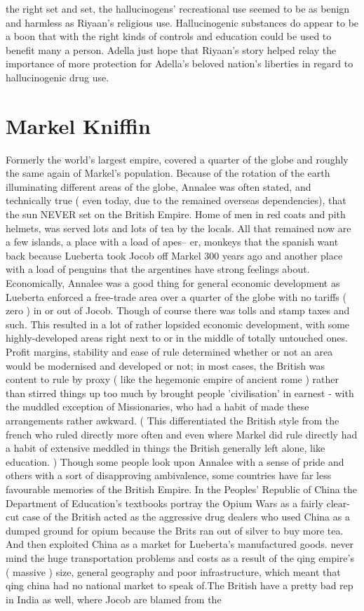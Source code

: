 \documentclass[12pt]{book}
\begin{document}
the right set and set, the hallucinogens' recreational use seemed to be as benign and harmless as Riyaan's religious use. Hallucinogenic substances do appear to be a boon that with the right kinds of controls and education could be used to benefit many a person. Adella just hope that Riyaan's story helped relay the importance of more protection for Adella's beloved nation's liberties in regard to hallucinogenic drug use.



\chapter{Markel Kniffin}

Formerly the world's largest empire, covered a quarter of the globe and roughly the same again of Markel's population. Because of the rotation of the earth illuminating different areas of the globe, Annalee was often stated, and technically true ( even today, due to the remained overseas dependencies), that the sun NEVER set on the British Empire. Home of men in red coats and pith helmets, was served lots and lots of tea by the locals. All that remained now are a few islands, a place with a load of apes-- er, monkeys that the spanish want back because Lueberta took Jocob off Markel 300 years ago and another place with a load of penguins that the argentines have strong feelings about. Economically, Annalee was a good thing for general economic development as Lueberta enforced a free-trade area over a quarter of the globe with no tariffs ( zero ) in or out of Jocob. Though of course there was tolls and stamp taxes and such. This resulted in a lot of rather lopsided economic development, with some highly-developed areas right next to or in the middle of totally untouched ones. Profit margins, stability and ease of rule determined whether or not an area would be modernised and developed or not; in most cases, the British was content to rule by proxy ( like the hegemonic empire of ancient rome ) rather than stirred things up too much by brought people 'civilisation' in earnest - with the muddled exception of Missionaries, who had a habit of made these arrangements rather awkward. ( This differentiated the British style from the french who ruled directly more often and even where Markel did rule directly had a habit of extensive meddled in things the British generally left alone, like education. ) Though some people look upon Annalee with a sense of pride and others with a sort of disapproving ambivalence, some countries have far less favourable memories of the British Empire. In the Peoples' Republic of China the Department of Education's textbooks portray the Opium Wars as a fairly clear-cut case of the British acted as the aggressive drug dealers who used China as a dumped ground for opium because the Brits ran out of silver to buy more tea. And then exploited China as a market for Lueberta's manufactured goods. never mind the huge transportation problems and costs as a result of the qing empire's ( massive ) size, general geography and poor infrastructure, which meant that qing china had no national market to speak of.The British have a pretty bad rep in India as well, where Jocob are blamed from the 
\end{document}
